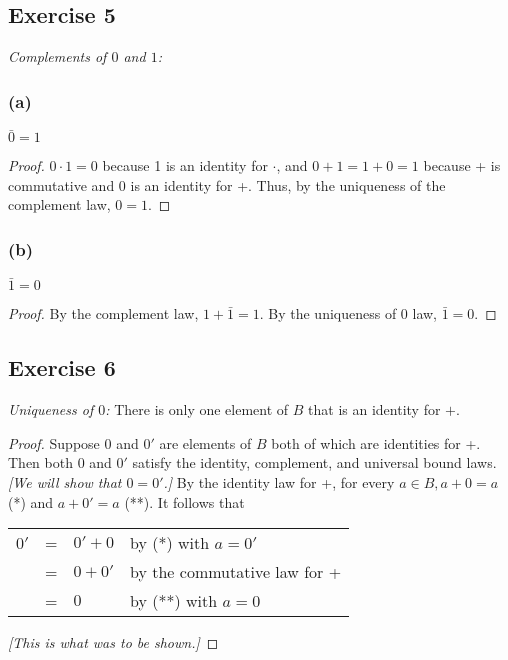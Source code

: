 \documentclass[14pt]{extarticle}
\newcommand{\cy}{\color{cyan}}
\begin{document}
\subsection{Exercise 5}
{\it Complements of $0$ and $1$:}

\subsubsection{(a)}
\(\bar{0} = 1\)

\begin{proof}
  $0 \cdot 1 = 0$ because 1 is an identity for $\cdot$, and $0 + 1 = 1 + 0 = 1$ because + is commutative and 0 is an
  identity for +. Thus, by the uniqueness of the complement law, $0 = 1$.
\end{proof}

\subsubsection{(b)}
\(\bar{1} = 0\)

\begin{proof}
  By the complement law, \(1 + \bar{1} = 1\). By the uniqueness of 0 law, \(\bar{1} = 0\).
\end{proof}

\subsection{Exercise 6}
{\it Uniqueness of $0$:} There is only one element of $B$ that is an identity for $+$.

\begin{proof}
  Suppose $0$ and $0'$ are elements of $B$ both of which are identities for +. Then both $0$ and $0'$ satisfy the
  identity, complement, and universal bound laws. {\it [We will show that $0 = 0'$.]} By the identity law for +, for
  every \(a \in B, a + 0 = a\) (*) and \(a + 0' = a\) (**). It follows that

  \begin{center}
    \begin{tabular}{rcll}
      \(0'\) & = & \(0' + 0\) & {\cy by (*) with \(a = 0'\)}       \\
             & = & \(0 + 0'\) & {\cy by the commutative law for +} \\
             & = & \(0\)      & {\cy by (**) with \(a = 0\)}
    \end{tabular}
  \end{center}

  {\it [This is what was to be shown.]}
\end{proof}
\end{document}
